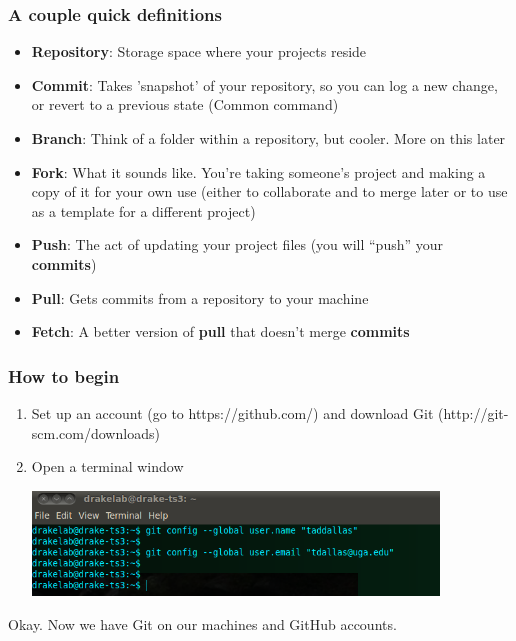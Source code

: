 \documentclass{beamer}\usepackage{graphicx, color}
\begin{document}
\begin{frame}
 \frametitle{A couple quick definitions}
  \begin{itemize}
    \item \textbf{Repository}: Storage space where your projects reside
    \item \textbf{Commit}: Takes 'snapshot' of your repository, so you can log a new change, or revert to a previous state (Common command)
    \item \textbf{Branch}: Think of a folder within a repository, but cooler. More on this later
    \item \textbf{Fork}: What it sounds like. You're taking someone's project and making a copy of it for your own use (either to collaborate and to merge later or to use as a template for a different project)
    \item \textbf{Push}: The act of updating your project files (you will ``push'' your \textbf{commits})
    \item \textbf{Pull}: Gets commits from a repository to your machine
    \item \textbf{Fetch}: A better version of \textbf{pull} that doesn't merge \textbf{commits}
  \end{itemize}
  \end{frame}








\begin{frame}
 \frametitle{How to begin}
\begin{enumerate}
 \item Set up an account (go to https://github.com/) and download Git (http://git-scm.com/downloads)
 \item Open a terminal window
\pause
\begin{center}
 \includegraphics[width=0.85\textwidth]{config.png}
\end{center}
\end{enumerate}
Okay. Now we have Git on our machines and GitHub accounts.
\end{frame}
\end{document}
